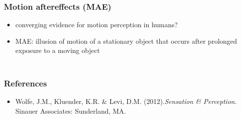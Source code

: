 \documentclass[]{beamer}
\begin{document}
\begin{frame}
 \frametitle{Motion aftereffects (MAE)}
\begin{overlayarea}{110mm}{70mm}
 \begin{itemize}
  \item converging evidence for motion perception in humans?
 \item<2-> MAE: illusion of motion of a stationary object that occurs after prolonged exposure to a moving object
 \end{itemize}

\end{overlayarea}
\end{frame}


\begin{frame}
 \frametitle{}
\begin{overlayarea}{110mm}{70mm}
\begin{columns}[T]
\begin{column}{70mm}
\end{column}

\begin{column}{50mm}
\end{column}
 \end{columns}
\end{overlayarea}
\end{frame}




\begin{frame}
 \frametitle{References}
\begin{small}
\begin{itemize}
 \item  Wolfe, J.M., Kluender, K.R. \& Levi, D.M. (2012).\textit{Sensation \& Perception}. Sinauer Associates: Sunderland, MA. 
\end{itemize}
\end{small}
\end{frame}
\end{document}
